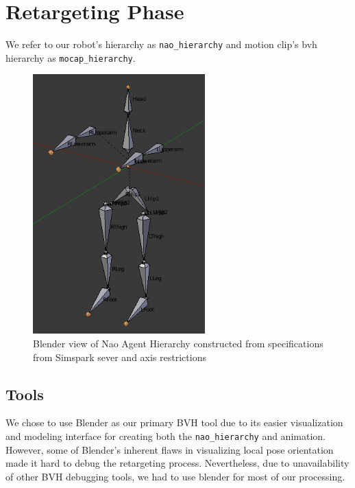 \section{Retargeting Phase}
	We refer to our robot's hierarchy as \texttt{nao\_hierarchy} and motion clip's bvh hierarchy as \texttt{mocap\_hierarchy}.
	


  \begin{figure}[!b]
  \centering
    \includegraphics[width=0.7\linewidth, height=10cm,keepaspectratio]{images/nao_hierarchy.png}
    \caption{Blender view of Nao Agent Hierarchy constructed from specifications from Simspark sever and axis restrictions}
    \label{fig:nao_hierarchy}
  \end{figure}
	
  \subsection{Tools}
  We chose to use Blender as our primary BVH tool due to its easier visualization and modeling interface for creating both the \texttt{nao\_hierarchy} and animation. However, some of Blender's inherent flaws in visualizing local pose orientation made it hard to debug the retargeting process. Nevertheless, due to unavailability of other BVH debugging tools, we had to use blender for most of our processing.

